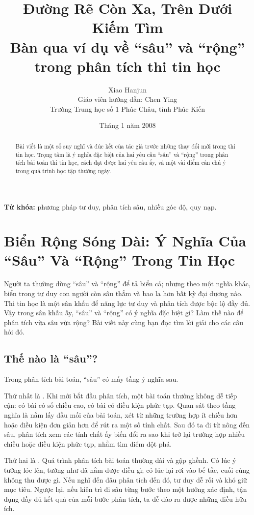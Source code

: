 \documentclass[11pt]{article}
\title{Đường Rẽ Còn Xa, Trên Dưới Kiếm Tìm\\
\large Bàn qua ví dụ về ``sâu'' và ``rộng'' trong phân tích thi tin học}
\author{Xiao Hanjun\\
Giáo viên hướng dẫn: Chen Ying\\
Trường Trung học số 1 Phúc Châu, tỉnh Phúc Kiến}
\date{Tháng 1 năm 2008}
\begin{document}
\maketitle


\begin{abstract}
Bài viết là một số suy nghĩ và đúc kết của tác giả trước những thay đổi mới
trong thi tin học. Trọng tâm là ý nghĩa đặc biệt của hai yêu cầu ``sâu'' và
``rộng'' trong phân tích bài toán thi tin học, cách đạt được hai yêu cầu ấy,
và một vài điểm cần chú ý trong quá trình học tập thường ngày.
\end{abstract}

\noindent\textbf{Từ khóa:} phương pháp tư duy, phân tích sâu, nhiều góc độ,
quy nạp.

\section{Biển Rộng Sóng Dài: Ý Nghĩa Của ``Sâu'' Và ``Rộng'' Trong Tin Học}

Người ta thường dùng ``sâu'' và ``rộng'' để tả biển cả; nhưng theo một nghĩa
khác, biển trong tư duy con người còn sâu thẳm và bao la hơn bất kỳ đại dương
nào. Thi tin học là một sân khấu để năng lực tư duy và phân tích được bộc lộ
đầy đủ. Vậy trong sân khấu ấy, ``sâu'' và ``rộng'' có ý nghĩa đặc biệt gì?
Làm thế nào để phân tích vừa sâu vừa rộng? Bài viết này cùng bạn đọc tìm lời
giải cho các câu hỏi đó.

\subsection{Thế nào là ``sâu''?}

Trong phân tích bài toán, ``sâu'' có mấy tầng ý nghĩa sau.

Thứ nhất là . Khi mới bắt đầu phân tích, một bài toán
thường không dễ tiếp cận: có bài có số chiều cao, có bài có điều kiện phức
tạp. Quan sát theo tầng nghĩa là nắm lấy đầu mối của bài toán, xét từ những
trường hợp ít chiều hơn hoặc điều kiện đơn giản hơn để rút ra một số tính
chất. Sau đó ta đi từ nông đến sâu, phân tích xem các tính chất ấy biến đổi
ra sao khi trở lại trường hợp nhiều chiều hoặc điều kiện phức tạp, nhằm tìm
điểm đột phá.

Thứ hai là . Quá trình phân tích bài toán thường dài và
gập ghềnh. Có lúc ý tưởng lóe lên, tưởng như đã nắm được điều gì; có lúc lại
rơi vào bế tắc, cuối cùng không thu được gì. Nếu nghĩ đến đâu phân tích đến
đó, tư duy dễ rối và khó giữ mục tiêu. Ngược lại, nếu kiên trì đi sâu từng
bước theo một hướng xác định, tận dụng đầy đủ kết quả của mỗi bước phân tích,
ta dễ đào ra được những điều hữu ích.
\end{document}
